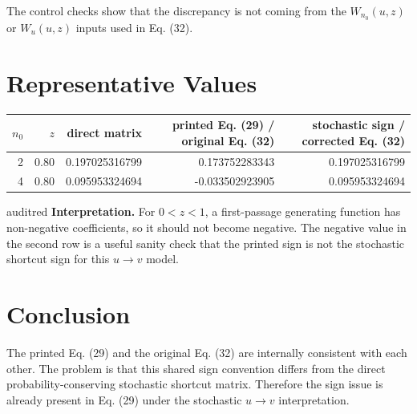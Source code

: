 \documentclass[11pt]{article}
\begin{document}
The control checks show that the discrepancy is not coming from the
\(W_{n_0}(u,z)\) or \(W_u(u,z)\) inputs used in Eq. (32).

\section*{Representative Values}

\begin{center}
\small
\begin{tabular}{@{}rrrrr@{}}
\toprule
\(n_0\) & \(z\) & direct matrix & printed Eq. (29) / original Eq. (32)
& stochastic sign / corrected Eq. (32) \\
\midrule
2 & 0.80 & 0.197025316799 & 0.173752283343 & 0.197025316799 \\
4 & 0.80 & 0.095953324694 & -0.033502923905 & 0.095953324694 \\
\bottomrule
\end{tabular}
\end{center}

\begin{resultbox}{auditred}
\textbf{Interpretation.}
For \(0<z<1\), a first-passage generating function has non-negative
coefficients, so it should not become negative.  The negative value in the
second row is a useful sanity check that the printed sign is not the stochastic
shortcut sign for this \(u\to v\) model.
\end{resultbox}

\section*{Conclusion}

The printed Eq. (29) and the original Eq. (32) are internally consistent with
each other.  The problem is that this shared sign convention differs from the
direct probability-conserving stochastic shortcut matrix.  Therefore the sign
issue is already present in Eq. (29) under the stochastic \(u\to v\)
interpretation.
\end{document}

